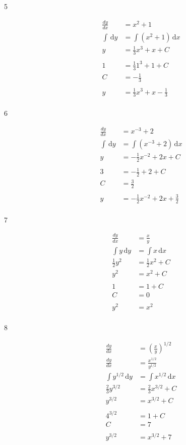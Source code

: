 \documentclass{exam}
\begin{document}
\begin{description}
\item[5]
\begin{align*}
  \frac{dy}{dx} &= x^2 + 1 \\
  \int \, \mathrm{d}y &= \int \left( x^2 + 1 \right) \, \mathrm{d}x \\
  y &= \frac{1}{3} x^3 + x + C \\
\\
  1 &= \frac{1}{3} 1^3 + 1 + C \\
  C &= - \frac{1}{3} \\
\\
  y &= \frac{1}{3} x^3 + x - \frac{1}{3} \\
\end{align*}

\item[6]
\begin{align*}
  \frac{dy}{dx} &= x^{-3} + 2 \\
  \int  \, \mathrm{d}y &= \int \left( x^{-3} + 2 \right) \, \mathrm{d}x \\
  y &= -\frac{1}{2}x^{-2} + 2x + C \\
\\
  3 &= -\frac{1}{2} + 2 + C \\
  C &= \frac{3}{2} \\
\\
  y &= -\frac{1}{2}x^{-2} + 2x + \frac{3}{2} \\
\end{align*}

\item[7]
\begin{align*}
  \frac{dy}{dx} &= \frac{x}{y} \\
  \int y \, \mathrm{d}y &= \int x \, \mathrm{d}x \\
  \frac{1}{2} y^2 &= \frac{1}{2} x^2 + C \\
  y^2 &= x^2 + C \\
\\
  1 &= 1 + C \\
  C &= 0 \\
\\
  y^2 &= x^2 \\
\end{align*}

\item[8]
\begin{align*}
  \frac{dy}{dx} &= \left( \frac{x}{y} \right)^{1/2} \\
  \frac{dy}{dx} &= \frac{x^{1/2}}{y^{1/2}} \\
  \int y^{1/2} \, \mathrm{d}y &= \int x^{1/2} \, \mathrm{d}x \\
  \frac{2}{3} y^{3/2} &= \frac{2}{3} x^{3/2} + C \\
  y^{3/2} &= x^{3/2} + C \\
\\
  4^{3/2} &= 1 + C \\
  C &= 7 \\
\\
  y^{3/2} &= x^{3/2} + 7 \\
\end{align*}


\end{description}
\end{document}
